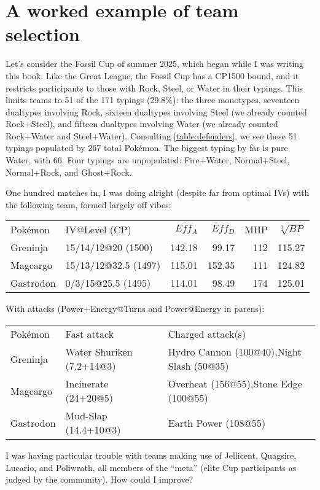 \chapter{A worked example of team selection}
\label{chap:example}

Let's consider the Fossil Cup of summer 2025, which began while I was writing this book.
Like the Great League, the Fossil Cup has a CP1500 bound, and it
  restricts participants to those with Rock, Steel, or Water in their typings.
This limits teams to 51 of the 171 typings (29.8\%): the three monotypes, seventeen dualtypes
 involving Rock, sixteen dualtypes involving Steel (we already counted Rock+Steel), and
 fifteen dualtypes involving Water (we already counted Rock+Water and Steel+Water).
Consulting \autoref{table:defenders}, we see these 51 typings populated by 267 total Pokémon.
The biggest typing by far is pure Water, with 66.
Four typings are unpopulated: Fire+Water, Normal+Steel, Normal+Rock, and Ghost+Rock.

One hundred matches in, I was doing alright (despite far from optimal IVs)
  with the following team, formed largely off vibes:
\begin{center}
  \begin{tabular}{llrrrr}
    Pokémon & IV@Level (CP) & $Eff_A$ & $Eff_D$ & MHP & $\sqrt[3]{BP}$\\
    \Midrule
    Greninja & 15/14/12@20 (1500) & 142.18 & 99.17 & 112 & 115.27 \\
    Magcargo & 15/13/12@32.5 (1497) & 115.01 & 152.35 & 111 & 124.82 \\
    Gastrodon & 0/3/15@25.5 (1495) & 114.01 & 98.49 & 174 & 125.01 \\
  \end{tabular}
\end{center}
With attacks (Power+Energy@Turns and Power@Energy in parens):
\begin{center}
  \begin{tabular}{llp{}}
    Pokémon & Fast attack & Charged attack(s)\\
    \Midrule
    Greninja & Water Shuriken (7.2+14@3) & Hydro Cannon (100@40),\newline Night Slash (50@35)\\
    Magcargo & Incinerate (24+20@5) & Overheat (156@55),\newline Stone Edge (100@55)\\
    Gastrodon & Mud-Slap (14.4+10@3) & Earth Power (108@55)\\
  \end{tabular}
\end{center}
I was having particular trouble with teams making use of Jellicent, Quagsire,
  Lucario, and Poliwrath, all members of the ``meta'' (elite Cup participants
  as judged by the community).
How could I improve?

